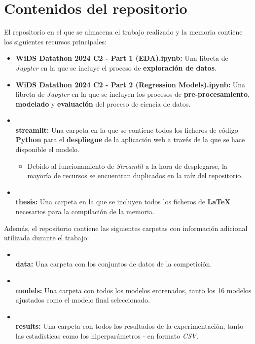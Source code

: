 \chapter{Contenidos del repositorio}

El repositorio en el que se almacena el trabajo realizado y la memoria contiene los siguientes recursos principales:

\begin{itemize}[leftmargin=*]
	\item \textbf{WiDS Datathon 2024 C2 - Part 1 (EDA).ipynb:} Una libreta de \textit{Jupyter} en la que se incluye el proceso de \textbf{exploración de datos}.
	\item \textbf{WiDS Datathon 2024 C2 - Part 2 (Regression Models).ipynb:} Una libreta de \textit{Jupyter} en la que se incluyen los procesos de \textbf{pre-procesamiento}, \textbf{modelado} y \textbf{evaluación} del proceso de ciencia de datos.
	\item \textbf{\\streamlit:} Una carpeta en la que se contiene todos los ficheros de código \textbf{Python} para el \textbf{despliegue} de la aplicación web a través de la que se hace disponible el modelo.
	\begin{itemize}
		\item Debido al funcionamiento de \textit{Streamlit} a la hora de desplegarse, la mayoría de recursos se encuentran duplicados en la raíz del repositorio.
	\end{itemize}
	\item  \textbf{\\thesis:} Una carpeta en la que se incluyen todos los ficheros de \textbf{LaTeX} necesarios para la compilación de la memoria.
		
		
\end{itemize}

Además, el repositorio contiene las siguientes carpetas con información adicional utilizada durante el trabajo:

\begin{itemize}[leftmargin=*]
	\item \textbf{\\data:} Una carpeta con los conjuntos de datos de la competición.
	\item \textbf{\\models:} Una carpeta con todos los modelos entrenados, tanto los 16 modelos ajustados como el modelo final seleccionado.
	\item \textbf{\\results:} Una carpeta con todos los resultados de la experimentación, tanto las estadísticas como los hiperparámetros - en formato \textit{CSV}.
\end{itemize}